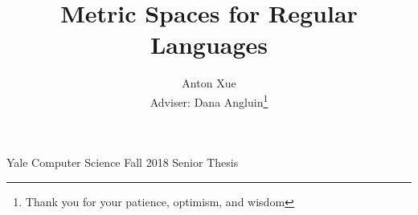 \documentclass[12pt]{article}
\title{Metric Spaces for Regular Languages}
\author{Anton Xue \\
  Adviser: Dana Angluin\thanks{Thank you for your patience, optimism, and wisdom}}
\date{}
\begin{document}
\maketitle

\begin{center}
  Yale Computer Science Fall 2018 Senior Thesis
\end{center}

\newpage

\tableofcontents

\newpage




















\newpage

\printbibliography


\end{document}
